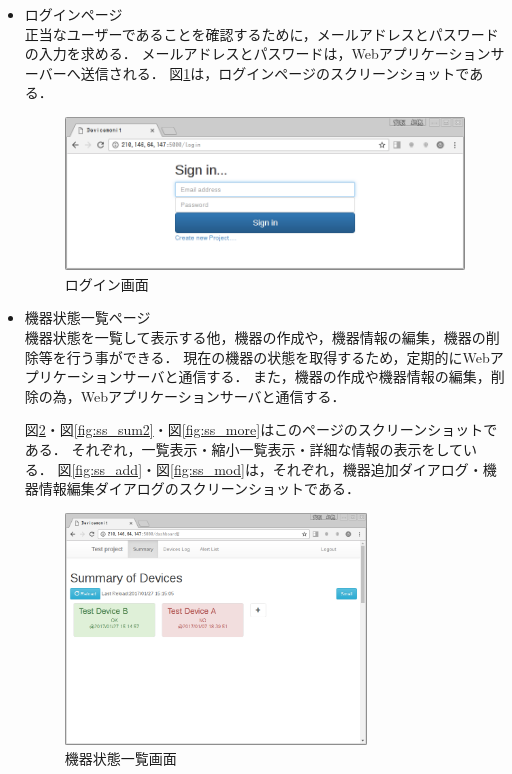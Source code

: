 \begin{itemize}
	\item ログインページ\\
		正当なユーザーであることを確認するために，メールアドレスとパスワードの入力を求める．
		メールアドレスとパスワードは，Webアプリケーションサーバーへ送信される．
		図\ref{fig:ss_login}は，ログインページのスクリーンショットである．
		\begin{figure}[htbp]
		\includegraphics[width=16cm]{images/login.png}
		\caption{ログイン画面}
		\label{fig:ss_login}
		\end{figure}

	\item 機器状態一覧ページ\\
		機器状態を一覧して表示する他，機器の作成や，機器情報の編集，機器の削除等を行う事ができる．
		現在の機器の状態を取得するため，定期的にWebアプリケーションサーバと通信する．
		また，機器の作成や機器情報の編集，削除の為，Webアプリケーションサーバと通信する．

		図\ref{fig:ss_sum1}・図\ref{fig:ss_sum2}・図\ref{fig:ss_more}はこのページのスクリーンショットである．
		それぞれ，一覧表示・縮小一覧表示・詳細な情報の表示をしている．
		図\ref{fig:ss_add}・図\ref{fig:ss_mod}は，それぞれ，機器追加ダイアログ・機器情報編集ダイアログのスクリーンショットである．
		\begin{figure}[htbp]
		\includegraphics[width=8cm]{images/screenshot_summary1.png}
		\caption{機器状態一覧画面}
		\label{fig:ss_sum1}
		\end{figure}
		

\end{itemize}
